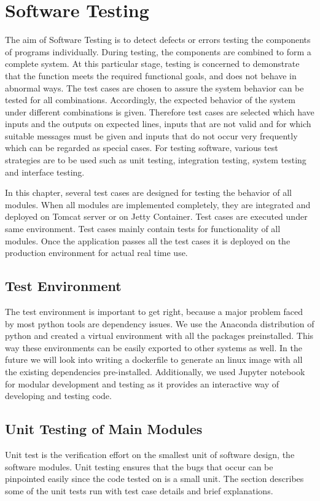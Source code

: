 \chapter{Software Testing}
The aim of Software Testing is to detect defects or errors testing the components of programs individually. During testing, the components are combined to form a complete system. At this particular stage, testing is concerned to demonstrate that the function meets the required functional goals, and does not behave in abnormal ways. The test cases are chosen to assure the system behavior can be tested for all combinations. Accordingly, the expected behavior of the system under different combinations is given. Therefore test cases are selected which have inputs and the outputs on expected lines, inputs that are not valid and for which suitable messages must be given and inputs that do not occur very frequently which can be regarded as special cases. For testing software, various test strategies are to be used such as unit testing, integration testing, system testing and interface testing.

In this chapter, several test cases are designed for testing the behavior of all modules. When all modules are implemented completely, they are integrated and deployed on Tomcat server or on Jetty Container. Test cases are executed under same environment. Test cases mainly contain tests for functionality of all modules. Once the application passes all the test cases it is deployed on the production environment for actual real time use.


\section{Test Environment}
The test environment is important to get right, because a major problem faced by most python tools are dependency issues. We use the Anaconda distribution of python and created a virtual environment with all the packages preinstalled. This way these environments can be easily exported to other systems as well. In the future we will look into writing a dockerfile to generate an linux image with all the existing dependencies pre-installed. Additionally, we used Jupyter notebook for modular development and testing as it provides an interactive way of developing and testing code.

\section{Unit Testing of Main Modules}
Unit test is the verification effort on the smallest unit of software design, the software modules. Unit testing ensures that the bugs that occur can be pinpointed easily since the code tested on is a small unit. The section describes some of the unit tests run with test case details and brief explanations.

